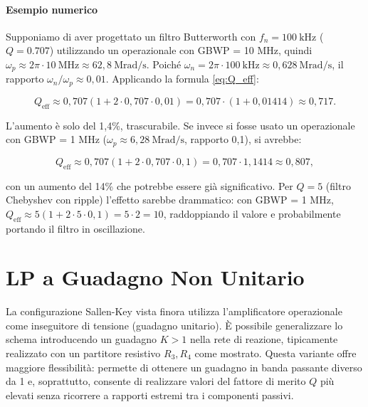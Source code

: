 \paragraph{Esempio numerico}
Supponiamo di aver progettato un filtro Butterworth con \(f_n = 100\ \text{kHz}\) (\(Q=0.707\)) utilizzando un operazionale con GBWP = 10 MHz, quindi \(\omega_p \approx 2\pi\cdot 10\ \text{MHz} \approx 62,8\ \text{Mrad/s}\). Poiché \(\omega_n = 2\pi\cdot100\ \text{kHz} \approx 0,628\ \text{Mrad/s}\), il rapporto \(\omega_n/\omega_p \approx 0,01\). Applicando la formula \ref{eq:Q_eff}:

\[
Q_{\text{eff}} \approx 0,707 \left(1 + 2\cdot 0,707 \cdot 0,01\right) = 0,707 \cdot (1 + 0,01414) \approx 0,717.
\]

L'aumento è solo del 1,4\%, trascurabile. Se invece si fosse usato un operazionale con GBWP = 1 MHz (\(\omega_p \approx 6,28\ \text{Mrad/s}\), rapporto 0,1), si avrebbe:

\[
Q_{\text{eff}} \approx 0,707 \left(1 + 2\cdot 0,707 \cdot 0,1\right) = 0,707 \cdot 1,1414 \approx 0,807,
\]

con un aumento del 14\% che potrebbe essere già significativo. Per \(Q=5\) (filtro Chebyshev con ripple) l'effetto sarebbe drammatico: con GBWP = 1 MHz, \(Q_{\text{eff}} \approx 5(1+2\cdot5\cdot0,1)=5\cdot2=10\), raddoppiando il valore e probabilmente portando il filtro in oscillazione.

















\section{LP a Guadagno Non Unitario}

La configurazione Sallen-Key vista finora utilizza l'amplificatore operazionale come inseguitore di tensione (guadagno unitario). È possibile generalizzare lo schema introducendo un guadagno \(K>1\) nella rete di reazione, tipicamente realizzato con un partitore resistivo \(R_3,R_4\) come mostrato. Questa variante offre maggiore flessibilità: permette di ottenere un guadagno in banda passante diverso da 1 e, soprattutto, consente di realizzare valori del fattore di merito \(Q\) più elevati senza ricorrere a rapporti estremi tra i componenti passivi.

